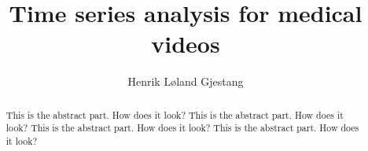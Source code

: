 \documentclass[english, a4paper]{report}
\title{Time series analysis for medical videos}
\author{Henrik Løland Gjestang}
\begin{document}
\duoforside[program={Computational Science},
  dept={Department of Informatics},
  option={Imaging and Biomedical Computing},
  long]


\begin{abstract}
This is the abstract part. How does it look? This is the abstract part. How does it look? This is the abstract part. How does it look? This is the abstract part. How does it look?
\end{abstract}



\tableofcontents
{}
\listoffigures
{}
\listoftables
\clearpage














\newpage
\printbibliography[heading=bibintoc]
\end{document}
